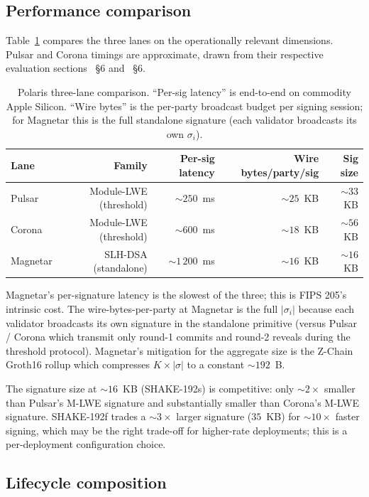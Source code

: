 \subsection{Performance comparison}
\label{sec:cmp:perf}

Table~\ref{tab:cmp-perf} compares the three lanes on the
operationally relevant dimensions. Pulsar and Corona timings are
approximate, drawn from their respective evaluation sections
\cite{lp073pulsarpaper}~\S6 and \cite{lp104corona}~\S6.

\begin{table}[H]
\centering
\caption{Polaris three-lane comparison.
``Per-sig latency'' is end-to-end on commodity Apple Silicon.
``Wire bytes'' is the per-party broadcast budget per signing session;
for Magnetar this is the full standalone signature
(each validator broadcasts its own $\sigma_i$).}
\label{tab:cmp-perf}
\begin{tabular}{lrrrr}
\toprule
Lane & Family & Per-sig latency & Wire bytes/party/sig & Sig size \\
\midrule
Pulsar & Module-LWE (threshold)  & $\sim 250$~ms & $\sim 25$~KB & $\sim 33$~KB \\
Corona & Module-LWE (threshold)    & $\sim 600$~ms & $\sim 18$~KB & $\sim 56$~KB \\
Magnetar & SLH-DSA (standalone) & $\sim 1\,200$~ms & $\sim 16$~KB & $\sim 16$~KB \\
\bottomrule
\end{tabular}
\end{table}

Magnetar's per-signature latency is the slowest of the three; this
is FIPS 205's intrinsic cost. The wire-bytes-per-party at Magnetar
is the full $|\sigma_i|$ because each validator broadcasts its own
signature in the standalone primitive (versus Pulsar / Corona
which transmit only round-1 commits and round-2 reveals during
the threshold protocol). Magnetar's mitigation for the aggregate
size is the Z-Chain Groth16 rollup which compresses $K \times
|\sigma|$ to a constant $\sim 192$~B.

The signature size at $\sim 16$~KB (SHAKE-192s) is competitive: only
$\sim 2\times$ smaller than Pulsar's M-LWE signature and
substantially smaller than Corona's M-LWE signature. SHAKE-192f
trades a $\sim 3\times$ larger signature ($35$~KB) for $\sim 10\times$
faster signing, which may be the right trade-off for higher-rate
deployments; this is a per-deployment configuration choice.

\subsection{Lifecycle composition}
\label{sec:cmp:lifecycle}

